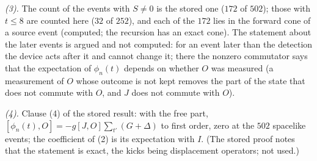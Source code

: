 \emph{(3).} The count of the events with $S \neq 0$ is the stored one ($172$ of $502$); those with $t \le 8$ are counted here ($32$ of $252$), and each of the $172$ lies in the forward cone of a source event (computed; the recursion has an exact cone). The statement about the later events is argued and not computed: for an event later than the detection the device acts after it and cannot change it; there the nonzero commutator says that the expectation of $\phi_{n}(t)$ depends on whether $O$ was measured (a measurement of $O$ whose outcome is not kept removes the part of the state that does not commute with $O$, and $J$ does not commute with $O$).

\emph{(4).} Clause (4) of the stored result: with the free part, $[\phi_{n}(t), O] = -g[J, O]\sum_{t'}(G + \Delta)$ to first order, zero at the $502$ spacelike events; the coefficient of (2) is its expectation with $I$. (The stored proof notes that the statement is exact, the kicks being displacement operators; not used.)

